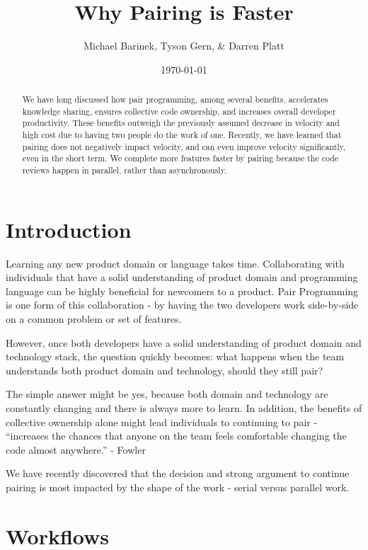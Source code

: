\documentclass[letterpaper]{article}
\title{Why Pairing is Faster}
\author{Michael Barinek, Tyson Gern, \& Darren Platt}
\date{\today}
\theoremstyle{definition}
\begin{document}
    \maketitle

    \begin{abstract}
        We have long discussed how pair programming, among several benefits, accelerates knowledge sharing, ensures
        collective code ownership, and increases overall developer productivity.
        These benefits outweigh the previously assumed decrease in velocity and high cost due to having two people do
        the work of one.
        Recently, we have learned that pairing does not negatively impact velocity, and can even improve velocity
        significantly, even in the short term.
        We complete more features faster by pairing because the code reviews happen in parallel, rather than asynchronously.
    \end{abstract}


    \section{Introduction}\label{sec:introduction}

    Learning any new product domain or language takes time. Collaborating with individuals that have a solid understanding
    of product domain and programming language can be highly beneficial for newcomers to a product. Pair Programming is
    one form of this collaboration - by having the two developers work side-by-side on a common problem or set of features.

    However, once both developers have a solid understanding of product domain and technology stack, the question quickly
    becomes: what happens when the team understands both product domain and technology, should they still pair?

    The simple answer might be yes, because both domain and technology are constantly changing and there is always more
    to learn. In addition, the benefits of collective ownership alone might lead individuals to continuing to pair -
    “increases the chances that anyone on the team feels comfortable changing the code almost anywhere.” - Fowler

    We have recently discovered that the decision and strong argument to continue pairing is most impacted by the shape
    of the work - serial versus parallel work.


    \section{Workflows}\label{sec:workflows}
\end{document}
